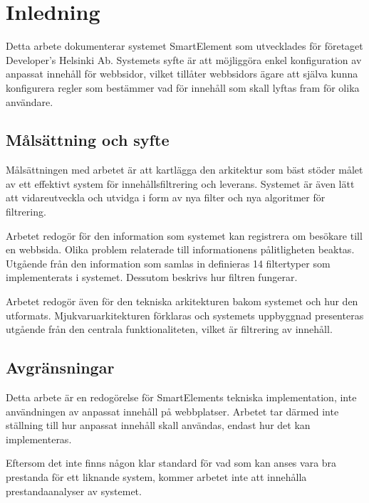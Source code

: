 \section{Inledning}

Detta arbete dokumenterar systemet SmartElement som utvecklades för företaget Developer’s Helsinki Ab. Systemets syfte är att möjliggöra enkel konfiguration av anpassat innehåll för webbsidor, vilket tillåter webbsidors ägare att själva kunna konfigurera regler som bestämmer vad för innehåll som skall lyftas fram för olika användare.

\subsection{Målsättning och syfte}

Målsättningen med arbetet är att kartlägga den arkitektur som bäst stöder målet av ett effektivt system för innehållsfiltrering och leverans. Systemet är även lätt att vidareutveckla och utvidga i form av nya filter och nya algoritmer för filtrering.

Arbetet redogör för den information som systemet kan registrera om besökare till en webbsida. Olika problem relaterade till informationens pålitligheten beaktas. Utgående från den information som samlas in definieras 14 filtertyper som implementerats i systemet. Dessutom beskrivs hur filtren fungerar. 

Arbetet redogör även för den tekniska arkitekturen bakom systemet och hur den utformats. Mjukvaruarkitekturen förklaras och systemets uppbyggnad presenteras utgående från den centrala funktionaliteten, vilket är filtrering av innehåll.

\subsection{Avgränsningar}

Detta arbete är en redogörelse för SmartElements tekniska implementation, inte användningen av anpassat innehåll på webbplatser. Arbetet tar därmed inte ställning till hur anpassat innehåll skall användas, endast hur det kan implementeras.

Eftersom det inte finns någon klar standard för vad som kan anses vara bra prestanda för ett liknande system, kommer arbetet inte att innehålla prestandaanalyser av systemet.

